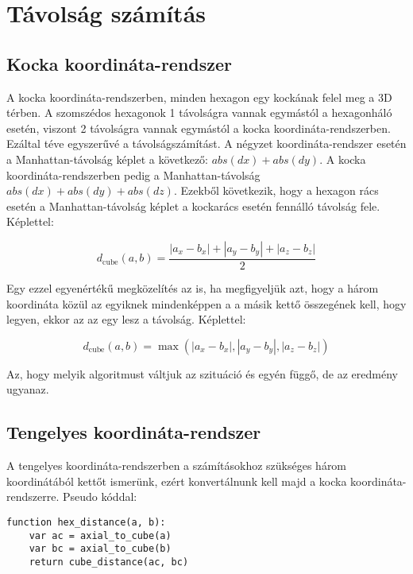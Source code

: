 \chapter{Távolság számítás}

\section{Kocka koordináta-rendszer}

A kocka koordináta-rendszerben, minden hexagon egy kockának felel meg a 3D térben. A szomszédos hexagonok 1 távolságra vannak egymástól a hexagonháló esetén, viszont 2 távolságra vannak egymástól a kocka koordináta-rendszerben. Ezáltal téve egyszerűvé a távolságszámítást. A négyzet koordináta-rendszer esetén a Manhattan-távolság képlet a következő: $abs(dx) + abs(dy)$. A kocka koordináta-rendszerben pedig a Manhattan-távolság $abs(dx) + abs(dy) + abs(dz)$. Ezekből következik, hogy a hexagon rács esetén a Manhattan-távolság képlet a kockarács esetén fennálló távolság fele.
\newline
\newline Képlettel:

$$
d_{\text{cube}}(a, b) =
\dfrac{|a_x - b_x| + |a_y - b_y| + |a_z - b_z|}{2}
$$

\noindent Egy ezzel egyenértékű megközelítés az is, ha megfigyeljük azt, hogy a három koordináta közül az egyiknek mindenképpen a a másik kettő összegének kell, hogy legyen, ekkor az az egy lesz a távolság. 
\newline
\newline Képlettel:

$$
d_{\text{cube}}(a, b) =
\max(
|a_x - b_x|, |a_y - b_y|, |a_z - b_z|
)
$$

\noindent Az, hogy melyik algoritmust váltjuk az szituáció és egyén függő, de az eredmény ugyanaz.

\section{Tengelyes koordináta-rendszer}

A tengelyes koordináta-rendszerben a számításokhoz szükséges három koordinátából kettőt ismerünk, ezért konvertálnunk kell majd a kocka koordináta-rendszerre.
\newline
\newline Pseudo kóddal:
\begin{verbatim}
function hex_distance(a, b):
    var ac = axial_to_cube(a)
    var bc = axial_to_cube(b)
    return cube_distance(ac, bc)
\end{verbatim}    

